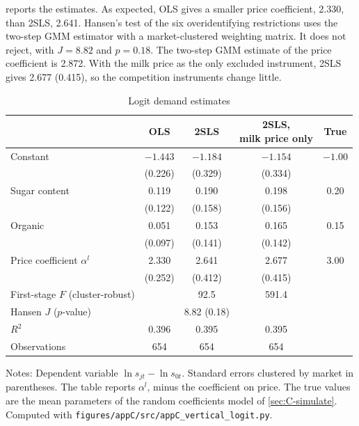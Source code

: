  reports the estimates. As expected, OLS gives a smaller price coefficient, 2.330, than 2SLS,
2.641. Hansen's test of the six overidentifying restrictions \citep{Hansen1982} uses the two-step GMM estimator with a
market-clustered weighting matrix. It does not reject, with $J = 8.82$ and $p = 0.18$. The two-step GMM estimate of the
price coefficient is 2.872. With the milk price as the only excluded instrument, 2SLS gives 2.677 (0.415), so the
competition instruments change little.

\begin{table}[htbp]
\centering
\caption{Logit demand estimates}
\label{tab:C-logit-demand}
\small
\begin{tabular}{@{}lcccc@{}}
\toprule
 & OLS & 2SLS & \makecell{2SLS,\\ milk price only} & True \\
\midrule
Constant & $-1.443$ & $-1.184$ & $-1.154$ & $-1.00$ \\
 & (0.226) & (0.329) & (0.334) & \\
Sugar content & 0.119 & 0.190 & 0.198 & 0.20 \\
 & (0.122) & (0.158) & (0.156) & \\
Organic & 0.051 & 0.153 & 0.165 & 0.15 \\
 & (0.097) & (0.141) & (0.142) & \\
Price coefficient $\alpha^l$ & 2.330 & 2.641 & 2.677 & 3.00 \\
 & (0.252) & (0.412) & (0.415) & \\
\midrule
First-stage $F$ (cluster-robust) & & 92.5 & 591.4 & \\
Hansen $J$ ($p$-value) & & 8.82 (0.18) & & \\
$R^2$ & 0.396 & 0.395 & 0.395 & \\
Observations & 654 & 654 & 654 & \\
\bottomrule
\end{tabular}

\vspace{3pt}
\begin{minipage}{0.97\textwidth}
\footnotesize Notes: Dependent variable $\ln s_{jt} - \ln s_{0t}$. Standard errors clustered by
market in parentheses. The table reports $\alpha^l$, minus the coefficient on price. The true values are the mean
parameters of the random coefficients model of \cref{sec:C-simulate}.
Computed with \texttt{figures/appC/src/appC\_vertical\_logit.py}.
\end{minipage}
\end{table}

